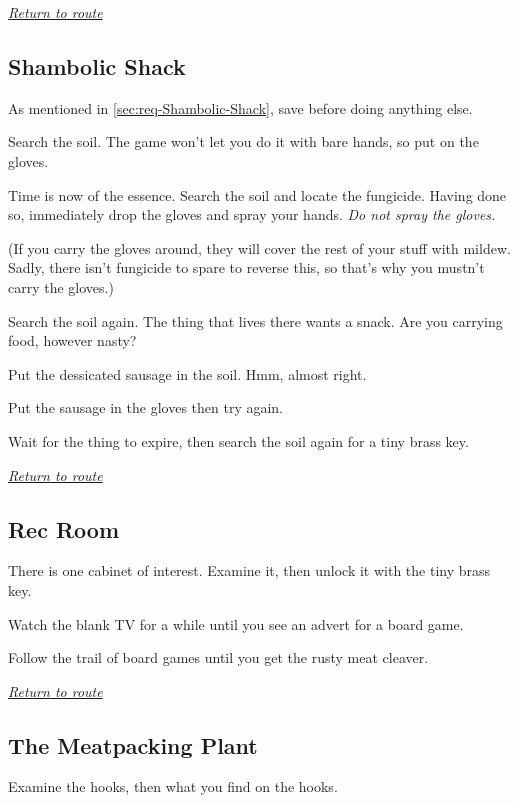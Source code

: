 \documentclass[a5paper]{extarticle}
\begin{document}
\hyperref[sec:route-10]{\emph{Return to route}}

\newpage
\subsection{Shambolic Shack}\label{sec:sol-Shambolic-Shack}

As mentioned in \cref{sec:req-Shambolic-Shack}, save before doing anything else.

Search the soil. The game won't let you do it with bare hands, so put on the gloves.

Time is now of the essence. Search the soil and locate the fungicide.
Having done so, immediately drop the gloves and spray your hands.
\emph{Do not spray the gloves.}

(If you carry the gloves around, they will cover the rest of your stuff with
mildew. Sadly, there isn't fungicide to spare to reverse this, so that's why
you mustn't carry the gloves.)

Search the soil again. The thing that lives there wants a snack. Are you carrying food,
however nasty?

Put the dessicated sausage in the soil. Hmm, almost right.

Put the sausage in the gloves then try again.

Wait for the thing to expire, then search the soil again for a tiny brass key.

\hyperref[sec:route-11]{\emph{Return to route}}

\newpage
\subsection{Rec Room}\label{sec:sol-Rec-Room}

There is one cabinet of interest. Examine it, then unlock it with the tiny brass key.

Watch the blank TV for a while until you see an advert for a board game.

Follow the trail of board games until you get the rusty meat cleaver.

\hyperref[sec:route-11]{\emph{Return to route}}

\newpage
\subsection{The Meatpacking Plant}\label{sec:sol-The-Meatpacking-Plant}

Examine the hooks, then what you find on the hooks.
\end{document}
